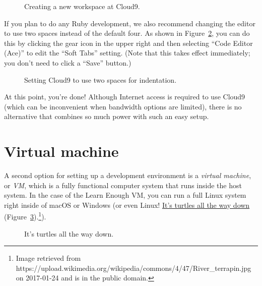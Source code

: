 \begin{figure}
\begin{center}
\end{center}
\caption{Creating a new workspace at Cloud9.\label{fig:cloud9_new_workspace}}
\end{figure}

If you plan to do any Ruby development, we also recommend changing the editor to use two spaces instead of the default four. As shown in Figure~\ref{fig:cloud9_two_spaces}, you can do this by clicking the gear icon in the upper right and then selecting ``Code Editor (Ace)'' to edit the ``Soft Tabs'' setting. (Note that this takes effect immediately; you don't need to click a ``Save'' button.)

\begin{figure}
\begin{center}
\end{center}
\caption{Setting Cloud9 to use two spaces for indentation.\label{fig:cloud9_two_spaces}}
\end{figure}

At this point, you're done! Although Internet access is required to use Cloud9 (which can be inconvenient when bandwidth options are limited), there is no alternative that combines so much power with such an easy setup.


\section{Virtual machine} %
\label{sec:virtual_machine}

A second option for setting up a development environment is a \emph{virtual machine}, or \emph{VM}, which is a fully functional computer system that runs inside the host system. In the case of the Learn Enough VM, you can run a full Linux system right inside of macOS or Windows (or even Linux! \href{https://en.wikipedia.org/wiki/Turtles_all_the_way_down}{It's turtles all the way down} (Figure~\ref{fig:turtles}).\footnote{Image retrieved from https://upload.wikimedia.org/wikipedia/commons/4/47/River_terrapin.jpg on 2017-01-24 and is in the public domain.}).

\begin{figure}
\begin{center}
\end{center}
\caption{It's turtles all the way down.\label{fig:turtles}}
\end{figure}

